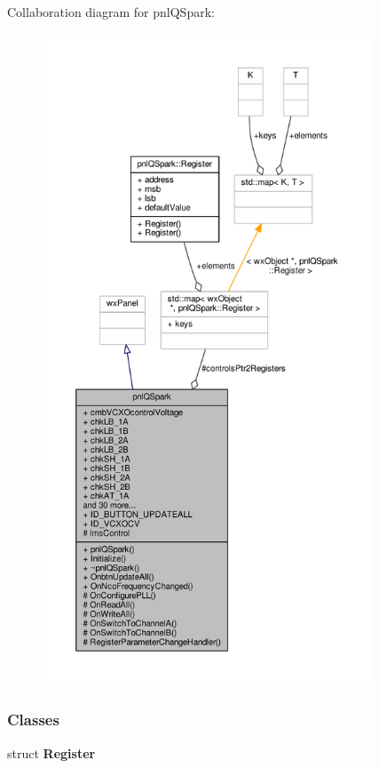 Collaboration diagram for pnl\+Q\+Spark\+:
\nopagebreak
\begin{figure}[H]
\begin{center}
\leavevmode
\includegraphics[height=550pt]{dd/de0/classpnlQSpark__coll__graph}
\end{center}
\end{figure}
\subsubsection*{Classes}
\begin{DoxyCompactItemize}
\item 
struct {\bf Register}
\end{DoxyCompactItemize}
